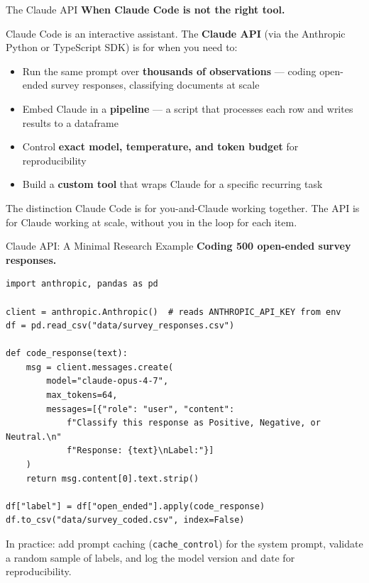 \documentclass[aspectratio=169, 11pt]{beamer}
\begin{document}
\begin{frame}{The Claude API}
  \textbf{When Claude Code is not the right tool.}

  \vspace{0.5em}
  Claude Code is an interactive assistant. The \textbf{Claude API} (via the Anthropic Python or TypeScript SDK) is for when you need to:
  \begin{itemize}\small
    \item Run the same prompt over \textbf{thousands of observations} --- coding open-ended survey responses, classifying documents at scale
    \item Embed Claude in a \textbf{pipeline} --- a script that processes each row and writes results to a dataframe
    \item Control \textbf{exact model, temperature, and token budget} for reproducibility
    \item Build a \textbf{custom tool} that wraps Claude for a specific recurring task
  \end{itemize}

  \vspace{0.5em}
  \begin{block}{The distinction}
    Claude Code is for you-and-Claude working together. The API is for Claude working at scale, without you in the loop for each item.
  \end{block}
\end{frame}

\begin{frame}[fragile]{Claude API: A Minimal Research Example}
  \textbf{Coding 500 open-ended survey responses.}

  \vspace{0.3em}
  \begin{lstlisting}[basicstyle=\ttfamily\scriptsize]
import anthropic, pandas as pd

client = anthropic.Anthropic()  # reads ANTHROPIC_API_KEY from env
df = pd.read_csv("data/survey_responses.csv")

def code_response(text):
    msg = client.messages.create(
        model="claude-opus-4-7",
        max_tokens=64,
        messages=[{"role": "user", "content":
            f"Classify this response as Positive, Negative, or Neutral.\n"
            f"Response: {text}\nLabel:"}]
    )
    return msg.content[0].text.strip()

df["label"] = df["open_ended"].apply(code_response)
df.to_csv("data/survey_coded.csv", index=False)
  \end{lstlisting}

  \vspace{0.2em}
  {\small\alert{In practice: add prompt caching (\texttt{cache\_control}) for the system prompt, validate a random sample of labels, and log the model version and date for reproducibility.}}
\end{frame}
\end{document}
